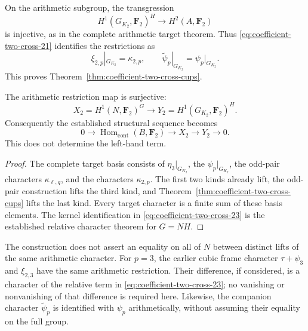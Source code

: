 On the arithmetic subgroup, the transgression
\[
 H^1(G_{K_2},\mathbf F_2)^H\longrightarrow H^2(A,\mathbf F_2)
\]
is injective, as in the complete arithmetic target
theorem. Thus \eqref{eq:coefficient-two-cross-21} identifies the restrictions as
\[
           \xi_{2,p}|_{G_{K_2}}=\kappa_{2,p},
       \qquad \widetilde\psi_p|_{G_{K_2}}=\psi_p|_{G_{K_2}}.
\]
This proves Theorem~\ref{thm:coefficient-two-cross-cups}.

\begin{corollary}\label{cor:all-arithmetic-quadratic-targets-lift}
The arithmetic restriction map is surjective:
\[
           X_2=H^1(N,\mathbf F_2)^G
              \longrightarrow Y_2=H^1(G_{K_2},\mathbf F_2)^H.
\]
Consequently the established structural sequence becomes
\begin{equation}
 0\longrightarrow\operatorname{Hom}_{\mathrm{cont}}
                         (B,\mathbf F_2)
   \longrightarrow X_2\longrightarrow Y_2\longrightarrow0.
                                                        \label{eq:coefficient-two-cross-23}
\end{equation}
This does not determine the left-hand term.
\end{corollary}

\begin{proof}
The complete target basis consists of \(\eta_3|_{G_{K_2}}\),
the \(\psi_p|_{G_{K_2}}\), the odd-pair characters
\(\kappa_{\ell,q}\), and the characters
\(\kappa_{2,p}\). The first two kinds already lift,
the odd-pair construction lifts the third kind, and
Theorem~\ref{thm:coefficient-two-cross-cups} lifts the
last kind. Every target character is a finite sum of
these basis elements. The kernel identification in
\eqref{eq:coefficient-two-cross-23} is the established relative character theorem
for \(G=NH\).
\end{proof}

\begin{remark}
The construction does not assert an equality on all
of \(N\) between distinct lifts of the same arithmetic
character. For \(p=3\), the earlier cubic frame
character \(\tau+\psi_3\) and \(\xi_{2,3}\) have the
same arithmetic restriction. Their difference, if
considered, is a character of the relative term in
\eqref{eq:coefficient-two-cross-23}; no vanishing or nonvanishing of that difference
is required here. Likewise, the companion character
\(\widetilde\psi_p\) is identified with \(\psi_p\)
arithmetically, without assuming their equality
on the full group.
\end{remark}

